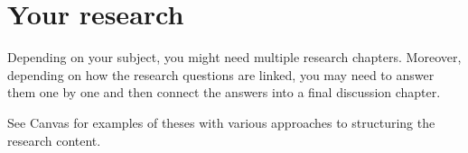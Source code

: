 \chapter{Your research}
\label{ch:research_method}

Depending on your subject, you might need multiple research chapters. Moreover, depending on how the research questions are linked, you may need to answer them one by one and then connect the answers into a final discussion chapter. 

See Canvas for examples of theses with various approaches to structuring the research content.